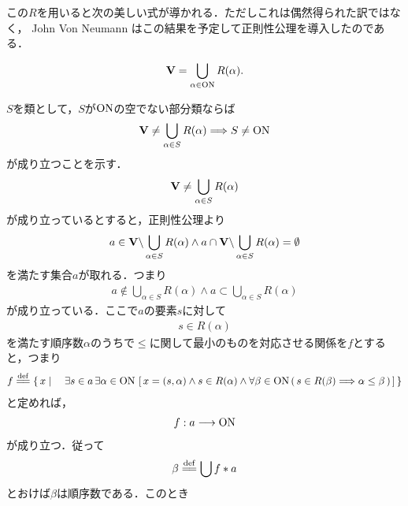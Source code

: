 	この$R$を用いると次の美しい式が導かれる．ただしこれは偶然得られた訳ではなく，
	John Von Neumann はこの結果を予定して正則性公理を導入したのである．
	
	\begin{screen}
		\begin{thm}[すべての集合は整礎的である]\label{thm:every_set_is_well_founded}
			\begin{align}
				\mathbf{V} = \bigcup_{\alpha \in \mathrm{ON}} R(\alpha).
			\end{align}
		\end{thm}
	\end{screen}
	
	\begin{prf}
		$S$を類として，$S$が$\mathrm{ON}$の空でない部分類ならば
		\begin{align}
			\mathbf{V} \neq \bigcup_{\alpha \in S} R(\alpha)
			\Longrightarrow S \neq \mathrm{ON}
		\end{align}
		が成り立つことを示す．
		\begin{align}
			\mathbf{V} \neq \bigcup_{\alpha \in S} R(\alpha)
		\end{align}
		が成り立っているとすると，正則性公理より
		\begin{align}
			a \in \mathbf{V} \backslash \bigcup_{\alpha \in S} R(\alpha)
			\wedge a \cap \mathbf{V} \backslash \bigcup_{\alpha \in S} R(\alpha) = \emptyset
		\end{align}
		を満たす集合$a$が取れる．つまり
		\begin{align}
			a \notin \bigcup_{\alpha \in S} R(\alpha) \wedge a \subset \bigcup_{\alpha \in S} R(\alpha)
		\end{align}
		が成り立っている．ここで$a$の要素$s$に対して
		\begin{align}
			s \in R(\alpha)
		\end{align}
		を満たす順序数$\alpha$のうちで$\leq$に関して最小のものを対応させる関係を$f$とすると，つまり
		\begin{align}
			f \defeq \Set{x}{\exists s \in a\, \exists \alpha \in \ON\, 
			\left[\, x = (s,\alpha) \wedge s \in R(\alpha) \wedge
			\forall \beta \in \ON\, (\, s \in R(\beta) \Longrightarrow \alpha \leq \beta\, )\, \right]}
		\end{align}
		と定めれば，
		\begin{align}
			f:a \longrightarrow \mathrm{ON}
		\end{align}
		が成り立つ．従って
		\begin{align}
			\beta \defeq \bigcup f \ast a
		\end{align}
		とおけば$\beta$は順序数である．このとき

\end{prf}

